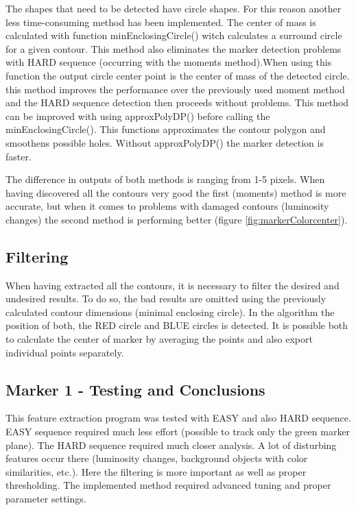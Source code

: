 The shapes that need to be detected have circle shapes. For this reason another less time-consuming 
method has been implemented. The center of mass is calculated with function minEnclosingCircle() witch calculates
a surround circle for a given contour. This method also eliminates the marker detection problems with HARD sequence (occurring with
the moments method).When using this function the output circle center point is the center of mass of the detected circle. this method improves the performance over the previously used moment method and the HARD sequence detection then proceeds without problems. This method can be improved with using approxPolyDP() before calling the minEnclosingCircle(). This functions approximates the contour polygon and smoothens possible holes. Without approxPolyDP() the marker detection is faster. 

The difference in outputs of both methods is ranging from 1-5 pixels. When having discovered all the contours very good the first (moments) method is more accurate, but when it comes to problems with damaged contours (luminosity changes) the second method is performing better (figure \ref{fig:markerColorcenter}). 

\subsection{Filtering}

When having extracted all the contours, it is necessary to filter the desired and undesired results. To do so, the bad results are
omitted using the previously calculated contour dimensions (minimal enclosing circle). In the algorithm the position of both, the RED circle and BLUE circles is detected. It is possible both to calculate the center of marker by averaging the points and also export individual points separately. 


\subsection{Marker 1 - Testing and Conclusions}
This feature extraction program was tested with EASY and also HARD sequence. EASY sequence required much less effort (possible to track only the green marker plane). The HARD sequence required much closer analysis. A lot of disturbing features occur there (luminosity changes, background objects with color similarities, etc.). Here the filtering is more important as well as proper
thresholding. The implemented method required advanced tuning and proper parameter settings. 

